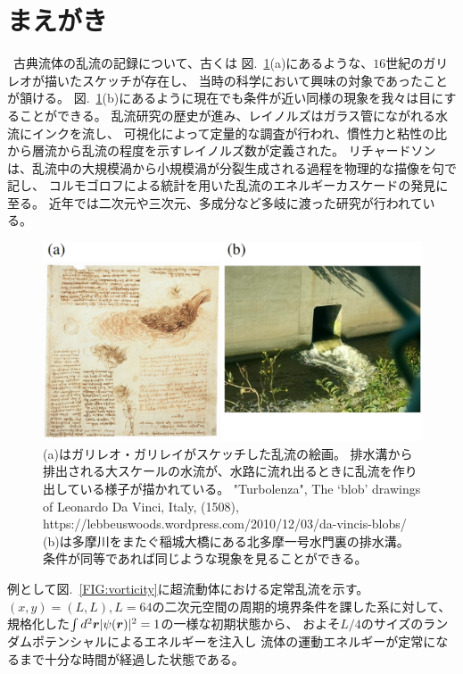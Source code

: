 \documentclass[12pt,a4paper]{jbook}
\def\Vec#1{\mbox{\boldmath $#1$}}			%
\begin{document}
		\section{まえがき}
		\ 古典流体の乱流の記録について、古くは
        図.~\ref{FIG:galileo}(a)にあるような、$16$世紀のガリレオが描いたスケッチが存在し、
        当時の科学において興味の対象であったことが頷ける。
        図.~\ref{FIG:galileo}(b)にあるように現在でも条件が近い同様の現象を我々は目にすることができる。
		乱流研究の歴史が進み、レイノルズはガラス管にながれる水流にインクを流し、
        可視化によって定量的な調査が行われ、慣性力と粘性の比から層流から乱流の程度を示すレイノルズ数が定義された。
        リチャードソンは、乱流中の大規模渦から小規模渦が分裂生成される過程を物理的な描像を句で記し、
        コルモゴロフによる統計を用いた乱流のエネルギーカスケードの発見に至る。
		近年では二次元や三次元、多成分など多岐に渡った研究が行われている。
		\begin{figure}[H]
			\centering
			\includegraphics[width=15cm]{galileo.eps}
			\caption{
			(a)はガリレオ・ガリレイがスケッチした乱流の絵画。
            排水溝から排出される大スケールの水流が、水路に流れ出るときに乱流を作り出している様子が描かれている。
            "Turbolenza", The ‘blob’ drawings of Leonardo Da Vinci, Italy, (1508),
            https://lebbeuswoods.wordpress.com/2010/12/03/da-vincis-blobs/
            (b)は多摩川をまたぐ稲城大橋にある北多摩一号水門裏の排水溝。
            条件が同等であれば同じような現象を見ることができる。
			}
			\label{FIG:galileo}
		\end{figure}
        例として図.~\ref{FIG:vorticity}に超流動体における定常乱流を示す。
        $(x,y)=(L,L), L=64$の二次元空間の周期的境界条件を課した系に対して、
        規格化した$\int d^2 \Vec{r} |\psi(\Vec{r})|^2=1$の一様な初期状態から、
        およそ$L/4$のサイズのランダムポテンシャルによるエネルギーを注入し
        流体の運動エネルギーが定常になるまで十分な時間が経過した状態である。
\end{document}
